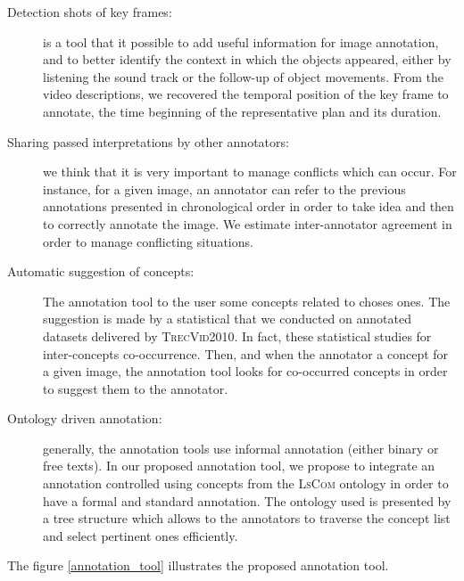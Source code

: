 	\begin{description}

		\item[Detection shots of key frames:] is a tool that  it possible to add useful 
		information for image annotation, and to better identify the context in which the objects
		appeared, either by listening  the sound track or the follow-up of object movements. 
		From the video descriptions, we recovered the temporal position of the key frame to annotate, 
		the time beginning of the representative plan and its duration.

		\item[Sharing passed interpretations by other annotators:] we think that it is very important 
		to manage conflicts which can occur. For instance, for a given image, an annotator can refer 
		to the previous annotations presented in chronological order in order to take idea and then 
		to correctly annotate the image. We estimate inter-annotator agreement in order to manage
		conflicting situations.

		\item[Automatic suggestion of concepts:] The annotation tool  to the user some concepts
		related to choses ones. The suggestion is made by a statistical  that we conducted 
		on annotated datasets delivered by \textsc{TrecVid2010}. In fact, these statistical studies 
		 for inter-concepts co-occurrence. Then, and when the annotator  a concept for 
		a given image, the annotation tool looks for co-occurred concepts in order to suggest 
		them to the annotator. 

		\item[Ontology driven annotation:] generally, the annotation tools use informal annotation
		(either binary or free texts). In our proposed annotation tool, we propose to integrate an 
		annotation controlled using concepts from the \textsc{LsCom} ontology in order to have a formal 
		and standard annotation. The ontology used is presented by a tree structure which allows to
		the annotators to traverse the concept list and select pertinent ones efficiently.
	\end{description}

	The figure \ref{annotation_tool} illustrates the proposed annotation tool.

